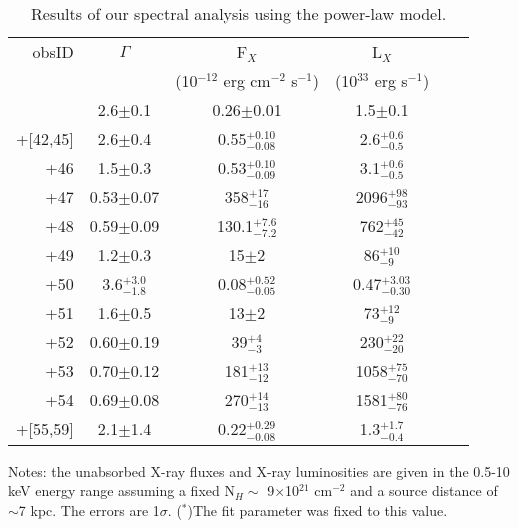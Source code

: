 \documentclass[a4paper,fleqn,usenatbib]{mnras}
\begin{document}
\begin{table*}
	\begin{center}
	\small
	\caption{Results of our spectral analysis using the power-law model.}
	\label{tab:Table2}
	\begin{threeparttable}
	\begin{tabular}{ | r | c | c | c | c | c |}	
		\hline
		obsID & $\Gamma$ & F$_{X}$ & L$_{X}$\\
		  & & (10$^{-12}$ erg cm$^{-2}$ s$^{-1}$) & (10$^{33}$ erg s$^{-1}$)\\
		\hline
		\smallskip
		0790180301 & 2.6$\pm$0.1 & 0.26$\pm$0.01 & 1.5$\pm$0.1 \\	
		\smallskip
		000311720+[42,45] & 2.6$\pm$0.4 & 0.55$^{+0.10}_{-0.08}$ & 2.6$^{+0.6}_{-0.5}$ \\
		\smallskip
		+46 & 1.5$\pm$0.3 & 0.53$^{+0.10}_{-0.09}$ & 3.1$^{+0.6}_{-0.5}$ \\
		\smallskip
		+47 & 0.53$\pm$0.07 & 358$^{+17}_{-16}$ & 2096$^{+98}_{-93}$ \\
		\smallskip		
		+48 & 0.59$\pm$0.09 & 130.1$^{+7.6}_{-7.2}$ & 762$^{+45}_{-42}$ \\
		\smallskip
		+49 & 1.2$\pm$0.3 & 15$\pm$2 & 86$^{+10}_{-9}$ \\
		\smallskip
		+50 & 3.6$^{+3.0}_{-1.8}$ & 0.08$^{+0.52}_{-0.05}$ & 0.47$^{+3.03}_{-0.30}$\\
		\smallskip
		+51 & 1.6$\pm$0.5 & 13$\pm$2 & 73$^{+12}_{-9}$ \\
		\smallskip
		+52 & 0.60$\pm$0.19 & 39$^{+4}_{-3}$ & 230$^{+22}_{-20}$ \\
		\smallskip	
		+53 & 0.70$\pm$0.12 & 181$^{+13}_{-12}$ & 1058$^{+75}_{-70}$ \\
		\smallskip	
		+54 & 0.69$\pm$0.08 & 270$^{+14}_{-13}$ & 1581$^{+80}_{-76}$ \\
		\smallskip	
		+[55,59] & 2.1$\pm$1.4 & 0.22$^{+0.29}_{-0.08}$ & 1.3$^{+1.7}_{-0.4}$ \\
		\hline
	\end{tabular}
	\begin{tablenotes}
	\scriptsize
	\item Notes: the unabsorbed X-ray fluxes and X-ray luminosities are given in the 0.5-10 keV energy range assuming a fixed N$_{H}\sim$ 9$\times$10$^{21}$ cm$^{-2}$ and a source distance of $\sim$7 kpc. The errors are 1$\sigma$. ($^{*}$)The fit parameter was fixed to this value.\\
	\end{tablenotes}
	\end{threeparttable}
	\end{center}
\end{table*}	


\bsp	%
\label{lastpage}
\end{document}
